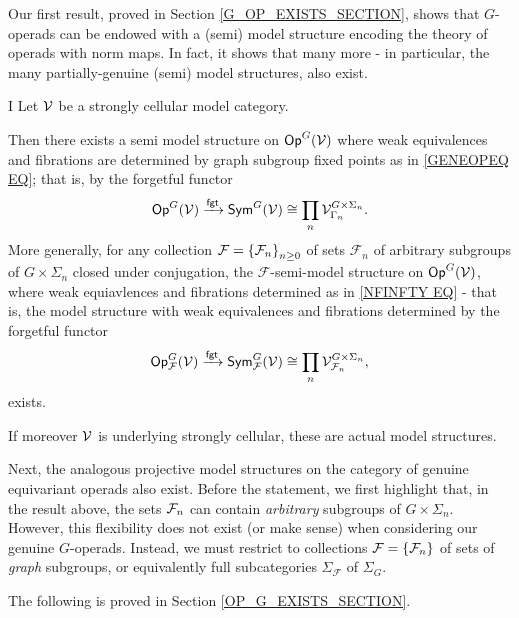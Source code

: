 \documentclass[a4paper,10pt]{article}%
\begin{document}
Our first result, proved in Section \ref{G_OP_EXISTS_SECTION}, shows that $G$-operads can be endowed with a (semi) model structure encoding the theory of operads with norm maps. In fact, it shows that many more - in particular, the many partially-genuine (semi) model structures, also exist.

\begin{customthm}{I}\label{MAINEXIST1 THM}
Let $\mathcal V$ be a strongly cellular model category.

Then there exists a semi model structure on $\mathsf{Op}^G(\mathcal V)$ where weak equivalences and fibrations are determined by graph subgroup fixed points as in \ref{GENEOPEQ EQ}; that is, by the forgetful functor
\[
\mathsf{Op}^G(\mathcal V) \xrightarrow{\mathsf{fgt}} \mathsf{Sym}^G(\mathcal V) \cong \prod_n \mathcal V^{G \times \Sigma_n}_{\Gamma_n}.
\]
More generally, for any collection $\mathcal F = \left\{\mathcal F_n\right\}_{n\geq 0}$ of sets $\mathcal F_n$ of arbitrary subgroups of $G\times \Sigma_n$ closed under conjugation, the $\mathcal F$-semi-model structure on $\mathsf{Op}^G(\mathcal V)$, where weak equiavlences and fibrations determined as in \ref{NFINFTY EQ} - that is, the model structure with weak equivalences and fibrations determined by the forgetful functor
\[
\mathsf{Op}^G_{\mathcal F}(\mathcal V) \xrightarrow{\mathsf{fgt}} \mathsf{Sym}^G_{\mathcal F}(\mathcal V) \cong \prod_n \mathcal V^{G\times \Sigma_n}_{\mathcal F_n},
\]
exists.

If moreover $\mathcal V$ is underlying strongly cellular, these are actual model structures.
\end{customthm}

Next, the analogous projective model structures on the category of genuine equivariant operads also exist. 
Before the statement, we first highlight that, in the result above, the sets $\mathcal F_n$ can contain \textit{arbitrary} subgroups of $G\times \Sigma_n$. 
However, this flexibility does not exist (or make sense) when considering our genuine $G$-operads. 
Instead, we must restrict to collections ${\mathcal F} = \left\{{\mathcal F}_n\right\}$ of sets of \textit{graph} subgroups, or equivalently full subcategories $\Sigma_{\mathcal F}$ of $\Sigma_G$. 

The following is proved in Section \ref{OP_G_EXISTS_SECTION}.
\end{document}
